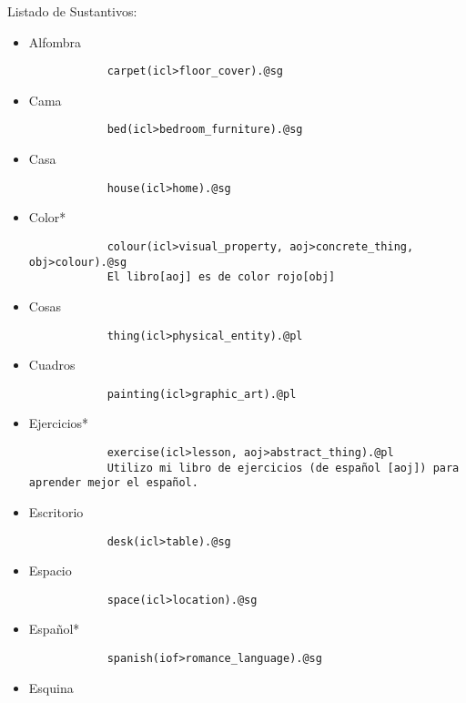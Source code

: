 \documentclass{article}
\begin{document}
    Listado de Sustantivos:
    \begin{itemize}
        \item Alfombra
        \begin{verbatim}
            carpet(icl>floor_cover).@sg
        \end{verbatim}
        \item Cama
        \begin{verbatim}
            bed(icl>bedroom_furniture).@sg
        \end{verbatim}
        \item Casa
        \begin{verbatim}
            house(icl>home).@sg
        \end{verbatim}
        \item Color*
        \begin{verbatim}
            colour(icl>visual_property, aoj>concrete_thing, obj>colour).@sg
            El libro[aoj] es de color rojo[obj] 
        \end{verbatim}
        \item Cosas
        \begin{verbatim}
            thing(icl>physical_entity).@pl
        \end{verbatim}
        \item Cuadros
        \begin{verbatim}
            painting(icl>graphic_art).@pl
        \end{verbatim}
        \item Ejercicios*
        \begin{verbatim}
            exercise(icl>lesson, aoj>abstract_thing).@pl
            Utilizo mi libro de ejercicios (de español [aoj]) para aprender mejor el español.
        \end{verbatim}
        \item Escritorio
        \begin{verbatim}
            desk(icl>table).@sg
        \end{verbatim}
        \item Espacio
        \begin{verbatim}
            space(icl>location).@sg
        \end{verbatim}
        \item Español*
        \begin{verbatim}
            spanish(iof>romance_language).@sg
        \end{verbatim}
        \item Esquina

\end{itemize}
\end{document}
